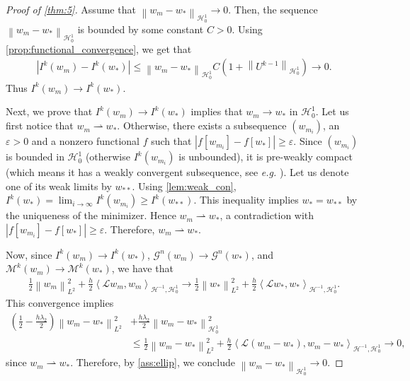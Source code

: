 \documentclass[11pt,a4paper,reqno]{amsart}
\numberwithin{equation}{section}
\theoremstyle{plain}
\theoremstyle{definition}
\def\e{{\varepsilon}}
\newcommand{\ip}[1]{\left\langle#1\right\rangle}
\newcommand{\cL}{\mathcal{L}}
\newcommand{\cH}{\mathcal{H}}
\newcommand{\norm}[1]{\left\|#1 \right\|} %
\newcommand{\abs}[1]{\left|#1\right|} %
\begin{document}
\begin{proof}[Proof of \cref{thm:5}]
Assume that $\norm{w_m - w_*}_{\cH_0^1} \to 0$. 
Then, the sequence $\norm{w_m - w_*}_{\cH_0^1}$ is bounded by some constant $C > 0$. 
Using \cref{prop:functional_convergence}, we get that
\begin{align*}
 \abs{I^k \left( w_m \right) - I^k \left( w_* \right)}\le \norm{w_m - w_*}_{\cH_0^1} C \left( 1 + \norm{U^{k - 1}}_{\cH_0^1} \right) \to 0.
\end{align*}
Thus $I^k \left( w_m \right)\to I^k \left( w_* \right)$. 

Next, we prove that $I^k \left( w_m \right)\to I^k \left( w_* \right)$ implies that $w_m\to w_*$ in $\cH_0^1$. 
Let us first notice that $w_m \rightharpoonup w_*$. 
Otherwise, there exists a subsequence $(w_{m_i})$, an $\e > 0$ and a nonzero functional $f$ such that $\abs{f \left[ w_{m_i} \right] - f \left[ w_* \right] } \ge \e$. 
Since $(w_{m_i})$ is bounded in $\cH_0^1$ (otherwise $I^k \left( w_{m_i} \right)$ is unbounded), it is pre-weakly compact (which means it has a weakly convergent subsequence, see \textit{e.g.} \citet[Corollary 4.56]{Jan}). 
Let us denote one of its weak limits by $w_{**}$. 
Using \cref{lem:weak_con}, $I^k \left( w_* \right) = \lim_{i \to \infty} I^k \left( w_{m_i} \right) \ge I^k \left( w_{**} \right)$. 
This inequality implies $w_* = w_{**}$ by the uniqueness of the minimizer. 
Hence $w_m \rightharpoonup w_*$, a contradiction with $\abs{f \left[ w_{m_i} \right] - f \left[ w_* \right] } \ge \e$. 
Therefore, $w_m \rightharpoonup w_*$.

Now, since $ I^k \left( w_m \right)\to I^k \left( w_* \right)$, $\mathcal{G}^n (w_m)\to \mathcal{G}^n(w_*)$, and $\mathcal{M}^k \left( w_m \right) \to \mathcal{M}^k \left( w_* \right)$, we have that
\begin{align*}
\frac{1}{2} \norm{w_m}^2_{L^2} + \frac{h}{2}\ip{\cL w_m,w_m}_{\cH^{-1},\cH_0^1} 
    \to \frac{1}{2} \norm{w_*}^2_{L^2} + \frac{h}{2} \ip{\cL w_*,w_*}_{\cH^{-1},\cH_0^1}.
\end{align*}
This convergence implies
\begin{align*}
\left( \frac{1 }{2}-\frac{h\lambda_2}{2} \right) \norm{w_m - w_*}^2_{L^2} &+ \frac{h\lambda_2}{2}\norm{w_m - w_*}^2_{\cH_0^1} \\
    &\le \frac{1 }{2} \norm{w_m - w_*}^2_{L^2} + \frac{h}{2} \ip{\cL (w_m-w_*), w_m -w_*}_{\cH^{-1},\cH_0^1} \to 0,
\end{align*}
since $w_m \rightharpoonup w_*$. 
Therefore, by \cref{ass:ellip}, we conclude $\norm{w_m - w_*}_{\cH_0^1} \to 0$.
\end{proof}
\end{document}
